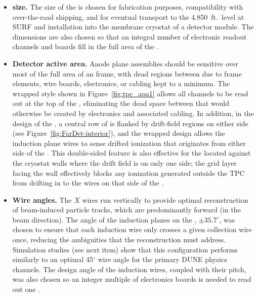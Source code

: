 


\begin{itemize}
\item \textbf{ size.} The size of the  is chosen for fabrication purposes, compatibility with over-the-road shipping, and for eventual transport to the \SI{4,850}{ft}.~level at SURF and installation into the membrane cryostat of a detector module. The dimensions are also chosen so that an integral number of electronic readout channels and boards fill in the full area of the .


\item \textbf{Detector active area.} Anode plane assemblies should be sensitive over most of the full area of an  frame, with dead regions between  due to frame elements, wire boards, electronics, or cabling kept to a minimum.  The wrapped style shown in Figure~\ref{fig:tpc_apa1} allows all channels to be read out at the top of the , eliminating the dead space between  that would otherwise be created by electronics and associated cabling. In addition, in the design of the , a central row of  is flanked by drift-field regions on either side (see Figure~\ref{fig:FarDet-interior}), and the wrapped design allows the induction plane wires to sense drifted ionization that originates from either side of the .  This double-sided feature is also effective for the  located against the cryostat walls where the drift field is on only one side; the grid layer facing the wall effectively blocks any ionization generated outside the TPC from drifting in to the wires on that side of the .        

\item \textbf{Wire angles.} The $X$ wires run vertically to provide optimal reconstruction of beam-induced particle tracks, which are predominantly forward (in the beam direction). The angle of the induction planes on the , $\pm35.7^{\circ}$, was chosen to ensure that each induction wire only crosses a given collection wire once, reducing the ambiguities that the reconstruction must address.  Simulation studies (see next item) show that this configuration performs similarly to an optimal 45$^\circ$ wire angle for the primary DUNE physics channels.  The design angle of the induction wires, coupled with their pitch, was also chosen so an integer multiple of electronics boards is needed to read out one .


\end{itemize}
